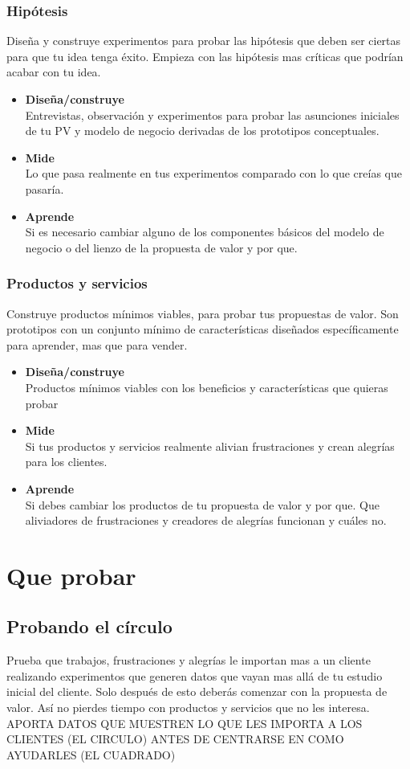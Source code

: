 \documentclass[11pt]{book}
\begin{document}
\subsubsection{Hipótesis}
Diseña y construye experimentos para probar las hipótesis que deben ser ciertas para que tu idea tenga éxito. Empieza con las hipótesis mas críticas que podrían acabar con tu idea.
\begin{itemize}
\item \textbf{ Diseña/construye }\\
Entrevistas, observación y experimentos para probar las asunciones iniciales de tu PV y modelo de negocio derivadas de los prototipos conceptuales.
\item \textbf{ Mide }\\
Lo que pasa realmente en tus experimentos comparado con lo que creías que pasaría.
\item \textbf{ Aprende }\\
Si es necesario cambiar alguno de los componentes básicos del modelo de negocio o del lienzo de la propuesta de valor y por que.
\end{itemize}

\subsubsection{Productos y servicios}
Construye productos mínimos viables, para probar tus propuestas de valor. Son prototipos con un conjunto mínimo de características diseñados específicamente para aprender, mas que para vender.
\begin{itemize}
\item \textbf{ Diseña/construye }\\
Productos mínimos viables con los beneficios y características que quieras probar
\item \textbf{ Mide }\\
Si tus productos y servicios realmente alivian frustraciones y crean alegrías para los clientes.
\item \textbf{ Aprende }\\
Si debes cambiar los productos de tu propuesta de valor y por que. Que aliviadores de frustraciones y creadores de alegrías funcionan y cuáles no.
\end{itemize}

\section{Que probar}
\subsection{Probando el círculo}
Prueba que trabajos, frustraciones y alegrías le importan mas a un cliente realizando experimentos que generen datos que vayan mas allá de tu estudio inicial del cliente. Solo después de esto deberás comenzar con la propuesta de valor. Así no pierdes tiempo con productos y servicios que no les interesa.\\ 
APORTA DATOS QUE MUESTREN LO QUE LES IMPORTA A LOS CLIENTES (EL CIRCULO) ANTES DE CENTRARSE EN COMO AYUDARLES (EL CUADRADO)
\end{document}
